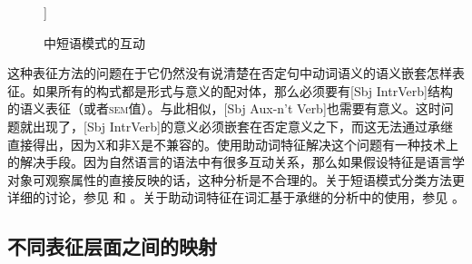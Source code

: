 \begin{exe}
\begin{xlist}[iv.]
\begin{exe}
\begin{xlist}[iv.]
\begin{figure}
\begin{forest}
  ]
\end{forest}
\caption{\label{Abbildung-Vererbungshierarchie-mehrfach-Croft} 中短语模式的互动}
\end{figure}%
这种表征方法的问题在于它仍然没有说清楚在否定句中动词语义的语义嵌套怎样表征。如果所有的构式都是形式与意义的配对体，那么必须要有[Sbj IntrVerb]结构的语义表征（\contvc{}或者\textsc{sem}值）。与此相似，[Sbj Aux-n't Verb]也需要有意义。这时问题就出现了，[Sbj IntrVerb]的意义必须嵌套在否定意义之下，而这无法通过承继直接得出，因为X和非X是不兼容的。使用助动词特征解决这个问题有一种技术上的解决手段。因为自然语言的语法中有很多互动关系，那么如果假设特征是语言学对象可观察属性的直接反映的话，这种分析是不合理的。关于短语模式分类方法更详细的讨论，参见 和 。关于助动词特征在词汇基于承继的分析中的使用，参见 。

\subsection{不同表征层面之间的映射}
\label{sec-mapping-between-levels}\label{sec-inheritance-passive-SimSyn}


\end{xlist}
\end{exe}
\end{xlist}
\end{exe}
